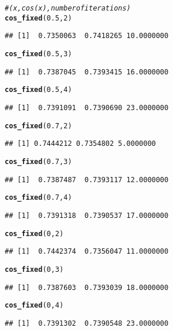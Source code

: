 \documentclass{article}\usepackage[]{graphicx}\usepackage[]{color}
\makeatletter
\newcommand{\hlnum}[1]{\textcolor[rgb]{0.686,0.059,0.569}{#1}}%
\newcommand{\hlcom}[1]{\textcolor[rgb]{0.678,0.584,0.686}{\textit{#1}}}%
\newcommand{\hlstd}[1]{\textcolor[rgb]{0.345,0.345,0.345}{#1}}%
\newcommand{\hlkwd}[1]{\textcolor[rgb]{0.737,0.353,0.396}{\textbf{#1}}}%
\newenvironment{kframe}{%
 \def\at@end@of@kframe{}%
 \ifinner\ifhmode%
  \def\at@end@of@kframe{\end{minipage}}%
  \begin{minipage}{\columnwidth}%
 \fi\fi%
 \def\FrameCommand##1{\hskip\@totalleftmargin \hskip-\fboxsep
 \colorbox{shadecolor}{##1}\hskip-\fboxsep
     \hskip-\linewidth \hskip-\@totalleftmargin \hskip\columnwidth}%
 \MakeFramed {\advance\hsize-\width
   \@totalleftmargin\z@ \linewidth\hsize
   \@setminipage}}%
 {\par\unskip\endMakeFramed%
 \at@end@of@kframe}
\newenvironment{knitrout}{}{} %
\makeatother
\begin{document}
\begin{knitrout}
\begin{kframe}
\begin{alltt}
\hlcom{# (x, cos(x), number of iterations)}
\hlkwd{cos_fixed}\hlstd{(}\hlnum{0.5}\hlstd{,} \hlnum{2}\hlstd{)}
\end{alltt}
\begin{verbatim}
## [1]  0.7350063  0.7418265 10.0000000
\end{verbatim}
\begin{alltt}
\hlkwd{cos_fixed}\hlstd{(}\hlnum{0.5}\hlstd{,} \hlnum{3}\hlstd{)}
\end{alltt}
\begin{verbatim}
## [1]  0.7387045  0.7393415 16.0000000
\end{verbatim}
\begin{alltt}
\hlkwd{cos_fixed}\hlstd{(}\hlnum{0.5}\hlstd{,} \hlnum{4}\hlstd{)}
\end{alltt}
\begin{verbatim}
## [1]  0.7391091  0.7390690 23.0000000
\end{verbatim}
\begin{alltt}
\hlkwd{cos_fixed}\hlstd{(}\hlnum{0.7}\hlstd{,} \hlnum{2}\hlstd{)}
\end{alltt}
\begin{verbatim}
## [1] 0.7444212 0.7354802 5.0000000
\end{verbatim}
\begin{alltt}
\hlkwd{cos_fixed}\hlstd{(}\hlnum{0.7}\hlstd{,} \hlnum{3}\hlstd{)}
\end{alltt}
\begin{verbatim}
## [1]  0.7387487  0.7393117 12.0000000
\end{verbatim}
\begin{alltt}
\hlkwd{cos_fixed}\hlstd{(}\hlnum{0.7}\hlstd{,} \hlnum{4}\hlstd{)}
\end{alltt}
\begin{verbatim}
## [1]  0.7391318  0.7390537 17.0000000
\end{verbatim}
\begin{alltt}
\hlkwd{cos_fixed}\hlstd{(}\hlnum{0}\hlstd{,} \hlnum{2}\hlstd{)}
\end{alltt}
\begin{verbatim}
## [1]  0.7442374  0.7356047 11.0000000
\end{verbatim}
\begin{alltt}
\hlkwd{cos_fixed}\hlstd{(}\hlnum{0}\hlstd{,} \hlnum{3}\hlstd{)}
\end{alltt}
\begin{verbatim}
## [1]  0.7387603  0.7393039 18.0000000
\end{verbatim}
\begin{alltt}
\hlkwd{cos_fixed}\hlstd{(}\hlnum{0}\hlstd{,} \hlnum{4}\hlstd{)}
\end{alltt}
\begin{verbatim}
## [1]  0.7391302  0.7390548 23.0000000
\end{verbatim}
\end{kframe}
\end{knitrout}
\end{document}
